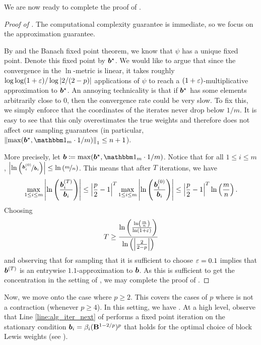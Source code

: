 \documentclass[11pt]{article}
\numberwithin{equation}{section}
\begin{document}
We are now ready to complete the proof of .

\begin{proof}[Proof of ]
The computational complexity guarantee is immediate, so we focus on the approximation guarantee.

By  and the Banach fixed point theorem, we know that $\psi$ has a unique fixed point. Denote this fixed point by $\bm{b}^{\star}$. We would like to argue that since the convergence in the $\ln$-metric is linear, it takes roughly $\log\log(1+\varepsilon)/\log\left\lvert 2/(2-p) \right\rvert$ applications of $\psi$ to reach a $(1+\varepsilon)$-multiplicative approximation to $\bm{b}^{\star}$. An annoying technicality is that if $\bm{b}^{\star}$ has some elements arbitrarily close to $0$, then the convergence rate could be very slow. To fix this, we simply enforce that the coordinates of the iterates never drop below $1/m$. It is easy to see that this only overestimates the true weights and therefore does not affect our sampling guarantees (in particular, $\norm{\max(\vb^{\star}, \onev_m \cdot 1/m)}_1 \le n + 1$).

More precisely, let $\vb \coloneqq \max(\vb^{\star}, \onev_m \cdot 1/m)$. Notice that for all $1 \le i \le m$, $\left\lvert \ln\left(\nicefrac{\bm{b}_i^{(0)}}{\bm{b}_i}\right) \right\rvert \le \ln\left(\nicefrac{m}{n}\right)$. This means that after $T$ iterations, we have
\begin{align*}
    \max_{1 \le i \le m} \left\lvert \ln\left(\frac{\bm{b}^{(T)}_i}{\bm{b}_i}\right) \right\rvert \le \left\lvert \frac{p}{2}-1 \right\rvert^T\max_{1 \le i \le m} \left\lvert \ln\left(\frac{\bm{b}_i^{(0)}}{\bm{b}_i}\right) \right\rvert \le  \left\lvert \frac{p}{2}-1 \right\rvert^T\ln\left(\frac{m}{n}\right).
\end{align*}
Choosing
\begin{align*}
    T \ge \frac{\ln\left(\frac{\ln\left(\frac{m}{n}\right)}{\ln\left(1+\varepsilon\right)}\right)}{\ln\left(\left\lvert \frac{2}{2-p} \right\rvert\right)}
\end{align*}
and observing that for sampling that it is sufficient to choose $\varepsilon = 0.1$ implies that $\bm{b}^{(T)}$ is an entrywise $1.1$-approximation to $\bm{b}$. As this is sufficient to get the concentration in the setting of , we may  complete the proof of .
\end{proof}

Now, we move onto the case where $p \ge 2$. This covers the cases of $p$ where  is not a contraction (whenever $p \ge 4$). In this setting, we have . At a high level, observe that Line \ref{line:alg_iter_next} of  performs a fixed point iteration on the stationary condition \(\bm{b}_i = \beta_i(\mathbf{B}^{1-2/p})^p\) that holds for the optimal choice of block Lewis weights (see \cite[proof of Lemma 4.2 and (4.5)]{jlls23}).
\end{document}
